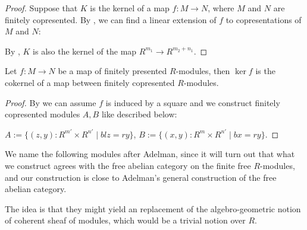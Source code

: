 \begin{proof}
  Suppose that $K$ is the kernel of a map $f : M \rightarrow N$, where $M$ and $N$ are finitely copresented.
  By , we can find a linear extension of $f$ to copresentations of $M$ and $N$:
  \begin{center}
  \end{center}
  By , $K$ is also the kernel of the map $R^{m_1} \rightarrow R^{m_2 + n_1}$.
\end{proof}

\begin{lemma}
  \label{kernel-fp-is-cok-fcp}
  Let $f:M\to N$ be a map of finitely presented $R$-modules, then $\ker f$ is the cokernel of a map between finitely copresented $R$-modules.
\end{lemma}

\begin{proof}
  By  we can assume $f$ is induced by a square and we construct finitely copresented modules $A,B$ like described below:
  \begin{center}
   \end{center}
   $A:=\{(z,y):R^{m'}\times R^{n'}\mid blz=ry\}$, $B:=\{(x,y):R^{m}\times R^{n'}\mid bx=ry\}$.
\end{proof}

We name the following modules after Adelman, since it will turn out that what we construct agrees with the free abelian category on the finite free $R$-modules, and our construction is close to Adelman's general construction of the free abelian category.

The idea is that they might yield an replacement of the algebro-geometric notion of coherent sheaf of modules, which would be a trivial notion over $R$.

